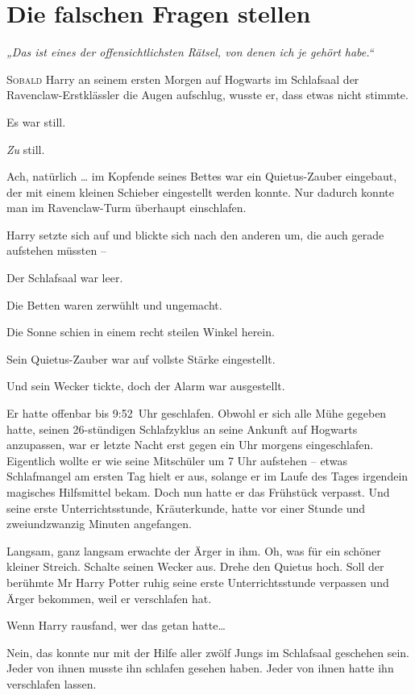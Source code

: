 \chapter{Die falschen Fragen stellen}

\emph{„Das ist eines der offensichtlichsten Rätsel, von denen ich je gehört habe.“}

\later 

\lettrine{S}{obald} Harry an seinem ersten Morgen auf Hogwarts im Schlafsaal der Ravenclaw-Erstklässler die Augen aufschlug, wusste er, dass etwas nicht stimmte. 

Es war still. 

\emph{Zu} still. 

Ach, natürlich … im Kopfende seines Bettes war ein Quietus-Zauber eingebaut, der mit einem kleinen Schieber eingestellt werden konnte. Nur dadurch konnte man im Ravenclaw-Turm überhaupt einschlafen. 

Harry setzte sich auf und blickte sich nach den anderen um, die auch gerade aufstehen müssten – 

Der Schlafsaal war leer. 

Die Betten waren zerwühlt und ungemacht. 

Die Sonne schien in einem recht steilen Winkel herein. 

Sein Quietus-Zauber war auf vollste Stärke eingestellt. 

Und sein Wecker tickte, doch der Alarm war ausgestellt. 

Er hatte offenbar bis 9:52~Uhr geschlafen. Obwohl er sich alle Mühe gegeben hatte, seinen 26-stündigen Schlafzyklus an seine Ankunft auf Hogwarts anzupassen, war er letzte Nacht erst gegen ein Uhr morgens eingeschlafen. Eigentlich wollte er wie seine Mitschüler um 7 Uhr aufstehen – etwas Schlafmangel am ersten Tag hielt er aus, solange er im Laufe des Tages irgendein magisches Hilfsmittel bekam. Doch nun hatte er das Frühstück verpasst. Und seine erste Unterrichtsstunde, Kräuterkunde, hatte vor einer Stunde und zweiundzwanzig Minuten angefangen. 

Langsam, ganz langsam erwachte der Ärger in ihm. Oh, was für ein schöner kleiner Streich. Schalte seinen Wecker aus. Drehe den Quietus hoch. Soll der berühmte Mr Harry Potter ruhig seine erste Unterrichtsstunde verpassen und Ärger bekommen, weil er verschlafen hat. 

Wenn Harry rausfand, wer das getan hatte… 

Nein, das konnte nur mit der Hilfe aller zwölf Jungs im Schlafsaal geschehen sein. Jeder von ihnen musste ihn schlafen gesehen haben. Jeder von ihnen hatte ihn verschlafen lassen. 

